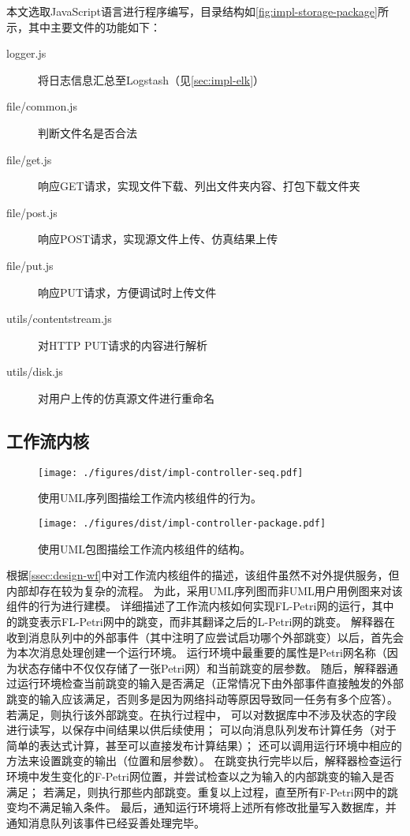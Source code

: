 \documentclass[index]{subfiles}
\begin{document}
本文选取JavaScript语言进行程序编写，目录结构如\cref{fig:impl-storage-package}所示，其中主要文件的功能如下：
\begin{description}
  \item[logger.js] 将日志信息汇总至Logstash（见\cref{sec:impl-elk}）
  \item[file/common.js] 判断文件名是否合法
  \item[file/get.js] 响应GET请求，实现文件下载、列出文件夹内容、打包下载文件夹
  \item[file/post.js] 响应POST请求，实现源文件上传、仿真结果上传
  \item[file/put.js] 响应PUT请求，方便调试时上传文件
  \item[utils/contentstream.js] 对HTTP PUT请求的内容进行解析
  \item[utils/disk.js] 对用户上传的仿真源文件进行重命名
\end{description}

\subsection{工作流内核}
\begin{figure}[h]
  \centering
  \texttt{[image: ./figures/dist/impl-controller-seq.pdf]}
  \caption[工作流内核组件的行为]{使用UML序列图描绘工作流内核组件的行为。\label{fig:impl-controller-seq}}
\end{figure}
\begin{figure}[h]
  \centering
  \texttt{[image: ./figures/dist/impl-controller-package.pdf]}
  \caption[工作流内核组件的结构]{使用UML包图描绘工作流内核组件的结构。\label{fig:impl-controller-package}}
\end{figure}
根据\cref{ssec:design-wf}中对工作流内核组件的描述，该组件虽然不对外提供服务，但内部却存在较为复杂的流程。
为此，采用UML序列图而非UML用户用例图来对该组件的行为进行建模。
详细描述了工作流内核如何实现FL-Petri网的运行，其中的跳变表示FL-Petri网中的跳变，而非其翻译之后的L-Petri网的跳变。
解释器在收到消息队列中的外部事件（其中注明了应尝试启功哪个外部跳变）以后，首先会为本次消息处理创建一个运行环境。
运行环境中最重要的属性是Petri网名称（因为状态存储中不仅仅存储了一张Petri网）和当前跳变的层参数。
随后，解释器通过运行环境检查当前跳变的输入是否满足（正常情况下由外部事件直接触发的外部跳变的输入应该满足，否则多是因为网络抖动等原因导致同一任务有多个应答）。
若满足，则执行该外部跳变。在执行过程中，
可以对数据库中不涉及状态的字段进行读写，以保存中间结果以供后续使用；
可以向消息队列发布计算任务（对于简单的表达式计算，甚至可以直接发布计算结果）；
还可以调用运行环境中相应的方法来设置跳变的输出（位置和层参数）。
在跳变执行完毕以后，解释器检查运行环境中发生变化的F-Petri网位置，并尝试检查以之为输入的内部跳变的输入是否满足；
若满足，则执行那些内部跳变。重复以上过程，直至所有F-Petri网中的跳变均不满足输入条件。
最后，通知运行环境将上述所有修改批量写入数据库，并通知消息队列该事件已经妥善处理完毕。
\end{document}
